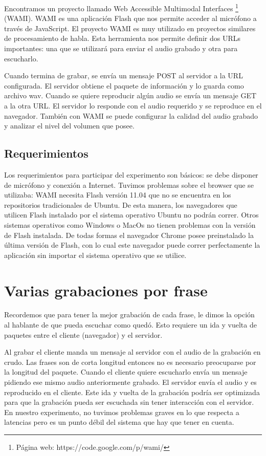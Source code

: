 Encontramos un proyecto llamado Web Accessible Multimodal Interfaces \footnote{Página web: https://code.google.com/p/wami/} (WAMI). WAMI es una aplicación Flash que nos permite acceder al micrófono a través de JavaScript. El proyecto WAMI es muy utilizado en proyectos similares de procesamiento de habla. Esta herramienta nos permite definir dos URLs importantes: una que se utilizará para enviar el audio grabado y otra para escucharlo.  

Cuando termina de grabar, se envía un mensaje POST al servidor a la URL configurada. El servidor obtiene el paquete de información y lo guarda como archivo wav. Cuando se quiere reproducir algún audio se envía un mensaje GET a la otra URL. El servidor lo responde con el audio requerido y se reproduce en el navegador. También con WAMI se puede configurar la calidad del audio grabado y analizar el nivel del volumen que posee. 

\subsection{Requerimientos}

Los requerimientos para participar del experimento son básicos: se debe disponer de micrófono y conexión a Internet. Tuvimos problemas sobre el browser que se utilizaba: WAMI necesita Flash versión 11.04 que no se encuentra en los repositorios tradicionales de Ubuntu. De esta manera, los navegadores que utilicen Flash instalado por el sistema operativo Ubuntu no podrán correr. Otros sistemas operativos como Windows o MacOs no tienen problemas con la versión de Flash instalada. De todas formas el navegador Chrome posee preinstalado la última versión de Flash, con lo cual este navegador puede correr perfectamente la aplicación sin importar el sistema operativo que se utilice.

\section{Varias grabaciones por frase}

Recordemos que para tener la mejor grabación de cada frase, le dimos la opción al hablante de que pueda escuchar como quedó. Esto requiere un ida y vuelta de paquetes entre el cliente (navegador) y el servidor. 

Al grabar el cliente manda un mensaje al servidor con el audio de la grabación en crudo. Las frases son de corta longitud entonces no es necesario preocuparse por la longitud del paquete. Cuando el cliente quiere escucharlo envía un mensaje pidiendo ese mismo audio anteriormente grabado. El servidor envía el audio y es reproducido en el cliente. Este ida y vuelta de la grabación podría ser optimizada para que la grabación pueda ser escuchada sin tener interacción con el servidor. En nuestro experimento, no tuvimos problemas graves en lo que respecta a latencias pero es un punto débil del sistema que hay que tener en cuenta.


